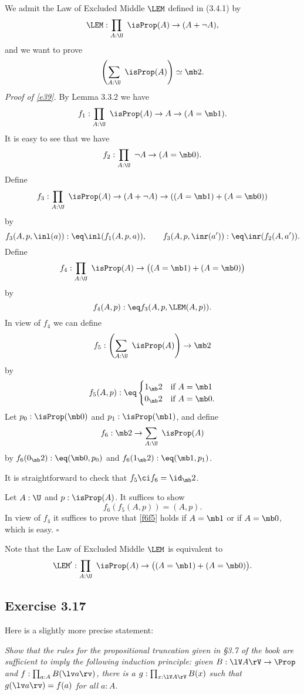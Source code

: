 \documentclass[12pt]{article}
\begin{document}
We admit the Law of Excluded Middle $\LEM$ defined in (3.4.1) by 
$$
\LEM:\prod_{A:\U}\ \isProp(A)\to(A+\neg A),
$$ 
and we want to prove 
\begin{equation}\label{e39}
\left(\sum_{A:\U}\ \isProp(A)\right)\simeq\mb2.
\end{equation}
\emph{Proof of \eqref{e39}.} By Lemma 3.3.2 we have 
$$
f_1:\prod_{A:\U}\ \isProp(A)\to A\to(A=\mb1). 
$$ 
It is easy to see that we have 
$$
f_2:\prod_{A:\U}\ \neg A\to(A=\mb0). 
$$ 
Define 
$$
f_3:\prod_{A:\U}\ \isProp(A)\to(A+\neg A)\to((A=\mb1)+(A=\mb0))
$$ 
by 
$$
f_3(A,p,\inl(a)):\eq\inl(f_1(A,p,a)),\qquad f_3(A,p,\inr(a')):\eq\inr(f_2(A,a')).
$$ 
Define 
$$
f_4:\prod_{A:\U}\ \isProp(A)\to\big((A=\mb1)+(A=\mb0)\big)
$$ 
by 
$$
f_4(A,p):\eq f_3(A,p,\LEM(A,p)).
$$ 
In view of $f_4$ we can define 
$$
f_5:\left(\sum_{A:\U}\ \isProp(A)\right)\to\mb2
$$ 
by 
$$
f_5(A,p):\eq
\begin{cases}
1_\mb2&\text{if }A=\mb1\\
0_\mb2&\text{if }A=\mb0.
\end{cases}
$$ 
Let $p_0:\isProp(\mb0)$ and $p_1:\isProp(\mb1)$, and define 
$$
f_6:\mb2\to\sum_{A:\U}\ \isProp(A)
$$ 
by $f_6(0_\mb2):\eq(\mb0,p_0)$ and $f_6(1_\mb2):\eq(\mb1,p_1)$.

It is straightforward to check that $f_5\ci f_6=\id_\mb2$. 

Let $A:\U$ and $p:\isProp(A)$. It suffices to show 
\begin{equation}\label{f6f5}
f_6(f_5(A,p))=(A,p).
\end{equation}
In view of $f_4$ it suffices to prove that \eqref{f6f5} holds if $A=\mb1$ or if $A=\mb0$, which is easy. $\square$ 

Note that the Law of Excluded Middle $\LEM$ is equivalent to 
$$
\LEM':\prod_{A:\U}\ \isProp(A)\to\big((A=\mb1)+(A=\mb0)\big).
$$ 


\subsection{Exercise 3.17}\label{317}

Here is a slightly more precise statement:

\emph{Show that the rules for the propositional truncation given in \S3.7 of the book are sufficient to imply the following induction principle: given $B:\lV A\rV\to\Prop$ and $f:\prod_{a:A}B(\lv a\rv)$, there is a $g:\prod_{x:\lV A\rV}B(x)$ such that $g(\lv a\rv)=f(a)$ for all $a:A$.}
\end{document}
